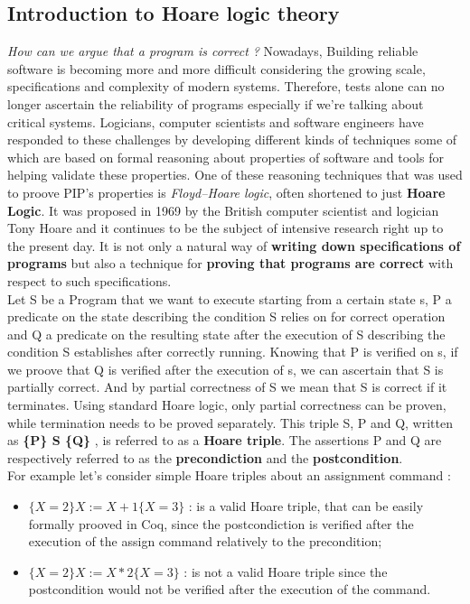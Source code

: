 \subsection{Introduction to Hoare logic theory}
\textit{How can we argue that a program is correct ?}
Nowadays, Building reliable software is becoming more and more difficult considering the growing scale, specifications and complexity of modern systems. Therefore, tests alone can no longer ascertain the reliability of programs especially if we're talking about critical systems. Logicians, computer scientists and software engineers have responded to these challenges by developing different kinds of techniques some of which are based on formal reasoning about properties of software and tools for helping validate these properties. One of these reasoning techniques that was used to proove PIP's properties is \textit{Floyd–Hoare logic}, often shortened to just \textbf{Hoare Logic}. It was proposed in 1969 by the British computer scientist and logician Tony Hoare and it continues to be the subject of intensive research right up to the present day. It is not only a natural way of \textbf{writing down specifications of programs} but also a technique for \textbf{proving that programs are correct} with respect to such specifications.\\

Let S be a Program that we want to execute starting from a certain state s, P a predicate on the state describing the condition S relies on for correct operation and Q a predicate on the resulting state after the execution of S describing the condition S establishes after correctly running. Knowing that P is verified on s, if we proove that Q is verified after the execution of s, we can ascertain that S is partially correct. And by partial correctness of S we mean that S is correct if it terminates. Using standard Hoare logic, only partial correctness can be proven, while termination needs to be proved separately. This triple S, P and Q, written as \textbf{ \{P\} S \{Q\} }, is referred to as a \textbf{Hoare triple}. The assertions P and Q are respectively referred to as the \textbf{precondiction} and the \textbf{postcondition}. \\

\noindent For example let's consider simple Hoare triples about an assignment command :
\begin{itemize}
	\item \boldmath$\{X=2\} X:=X+1 \{X=3\}$ : is a valid Hoare triple, that can be easily formally prooved in Coq, since the postcondiction is verified after the execution of the assign command relatively to the precondition;
	\item \boldmath$\{X=2\} X:=X*2 \{X=3\}$ : is not a valid Hoare triple since the postcondition would not be verified after the execution of the command.
\end{itemize} 

